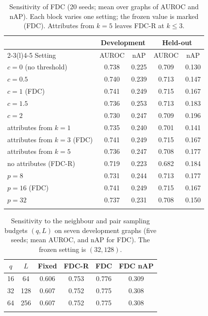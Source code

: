 \documentclass[pdflatex,sn-mathphys-ay]{sn-jnl}
\theoremstyle{plain}
\theoremstyle{remark}
\begin{document}
\begin{table}[!ht]
\caption{Sensitivity of FDC (20 seeds; mean over graphs of AUROC and nAP). Each block varies one setting; the frozen value is marked (FDC). Attributes from $k=5$ leaves FDC-R at $k\le3$.}
\label{tab:sens}
\footnotesize
\begin{tabular*}{\textwidth}{@{\extracolsep{\fill}}lcccc@{}}
\toprule
 & \multicolumn{2}{c}{Development} & \multicolumn{2}{c}{Held-out} \\
\cmidrule(lr){2-3}\cmidrule(l){4-5}
Setting & AUROC & nAP & AUROC & nAP \\
\midrule
$c=0$ (no threshold) & 0.738 & 0.225 & 0.709 & 0.130 \\
$c=0.5$ & 0.740 & 0.239 & 0.713 & 0.147 \\
$c=1$ (FDC) & 0.741 & 0.249 & 0.715 & 0.167 \\
$c=1.5$ & 0.736 & 0.253 & 0.713 & 0.183 \\
$c=2$ & 0.730 & 0.247 & 0.709 & 0.196 \\
\midrule
attributes from $k=1$ & 0.735 & 0.240 & 0.701 & 0.141 \\
attributes from $k=3$ (FDC) & 0.741 & 0.249 & 0.715 & 0.167 \\
attributes from $k=5$ & 0.736 & 0.247 & 0.708 & 0.177 \\
no attributes (FDC-R) & 0.719 & 0.223 & 0.682 & 0.184 \\
\midrule
$p=8$ & 0.731 & 0.244 & 0.713 & 0.177 \\
$p=16$ (FDC) & 0.741 & 0.249 & 0.715 & 0.167 \\
$p=32$ & 0.737 & 0.231 & 0.708 & 0.150 \\
\botrule
\end{tabular*}
\end{table}

\begin{table}[!ht]
\caption{Sensitivity to the neighbour and pair sampling budgets $(q,L)$ on seven development graphs (five seeds; mean AUROC, and nAP for FDC). The frozen setting is $(32,128)$.}
\label{tab:qL}
\footnotesize
\begin{tabular*}{\textwidth}{@{\extracolsep{\fill}}cccccc@{}}
\toprule
$q$ & $L$ & Fixed & FDC-R & FDC & FDC nAP \\
\midrule
16 & 64 & 0.606 & 0.753 & 0.776 & 0.309 \\
32 & 128 & 0.607 & 0.752 & 0.775 & 0.308 \\
64 & 256 & 0.607 & 0.752 & 0.775 & 0.308 \\
\botrule
\end{tabular*}
\end{table}
\end{document}
